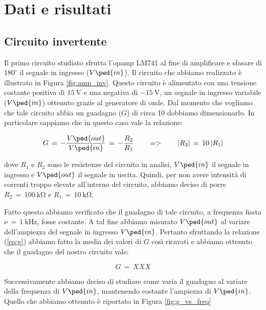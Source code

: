 \section*{Dati e risultati}

\subsection*{Circuito invertente}

Il primo circuito studiato sfrutta l'opamp LM741 al fine di amplificare e sfasare di $180^\circ$ il segnale in ingresso ($V\ped{in}$). Il circuito che abbiamo realizzato è illustrato in Figura \ref{fig:amp_inv}.
Questo circuito è alimentato con una tensione costante positiva di $\SI{+15}{\volt}$ e una negativa di $\SI{-15}{\volt}$, un segnale in ingresso variabile ($V\ped{in}$) ottenuto grazie al generatore di onde.
Dal momento che vogliamo che tale circuito abbia un guadagno ($G$) di circa 10 dobbiamo dimensionarlo. In particolare sappiamo che in questo caso vale la relazione:

\begin{equation}
        G\,=\,-\frac{V\ped{out}}{V\ped{in}}\,=\,-\frac{R_2}{R_1} \qquad => \qquad |R_2|\,=\,10\,|R_1|
        \label{eq:g}
\end{equation}

dove $R_1$ e $R_2$ sono le resistenze del circuito in analisi, $V\ped{in}$ il segnale in ingresso e $V\ped{out}$ il segnale in uscita. Quindi, per non avere intensità di correnti troppo elevate all'interno del circuito, abbiamo deciso di porre $R_2\,=\,\SI{100}{\kilo\ohm}$ e $R_1\,=\,\SI{10}{\kilo\ohm}$.

Fatto questo abbiamo verificato che il guadagno di tale circuito, a frequenza fissta $\nu\,=\,\SI{1}{\kilo\hertz}$, fosse costante. A tal fine abbiamo misurato $V\ped{out}$ al variare dell'ampiezza del segnale in ingresso $V\ped{in}$. Pertanto sfruttando la relazione (\ref{eq:g}) abbiamo fatto la media dei valori di $G$ così ricavati e abbiamo ottenuto che il guadagno del nostro circuito vale:

\begin{equation}
        G\,=\, XXX
\end{equation}

Successivamente abbiamo deciso di studiare come varia il guadagno al variare della frequenza di $V\ped{in}$, mantenendo costante l'ampiezza di $V\ped{in}$. Quello che abbiamo ottenuto è riportato in Figura \ref{fig:g_vs_freq}

